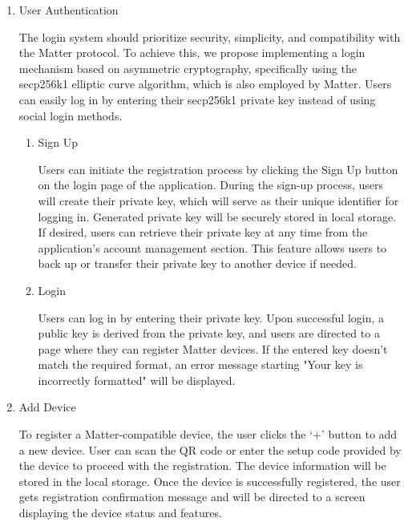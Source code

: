 \documentclass[conference]{IEEEtran}
\begin{document}
\begin{enumerate}[itemsep=2ex, parsep=1ex]
	\item User Authentication
	              
	      The login system should prioritize security, simplicity, and compatibility with the Matter protocol. To achieve this, we propose implementing a login mechanism based on asymmetric cryptography, specifically using the secp256k1 elliptic curve algorithm, which is also employed by Matter. Users can easily log in by entering their secp256k1 private key instead of using social login methods.
	              
	      \begin{enumerate}[itemsep=2ex, parsep=1ex]
	      	\item Sign Up
	      	      
	      	      Users can initiate the registration process by clicking the Sign Up button on the login page of the application. During the sign-up process, users will create their private key, which will serve as their unique identifier for logging in. Generated private key will be securely stored in local storage. If desired, users can retrieve their private key at any time from the application's account management section. This feature allows users to back up or transfer their private key to another device if needed.
	      	      
	      	\item Login
	      	      
	      	      Users can log in by entering their private key.
	      	      Upon successful login, a public key is derived from the private key, and users are directed to a page where they can register Matter devices. If the entered key doesn't match the required format, an error message starting "Your key is incorrectly formatted" will be displayed.
	      \end{enumerate}
	              
	\item Add Device
	      
	      To register a Matter-compatible device, the user clicks the ‘+’ button to add a new device. User can scan the QR code or enter the setup code provided by the device to proceed with the registration. The device information will be stored in the local storage. Once the device is successfully registered, the user gets registration confirmation message and will be directed to a screen displaying the device status and features.
	              

\end{enumerate}
\end{document}
